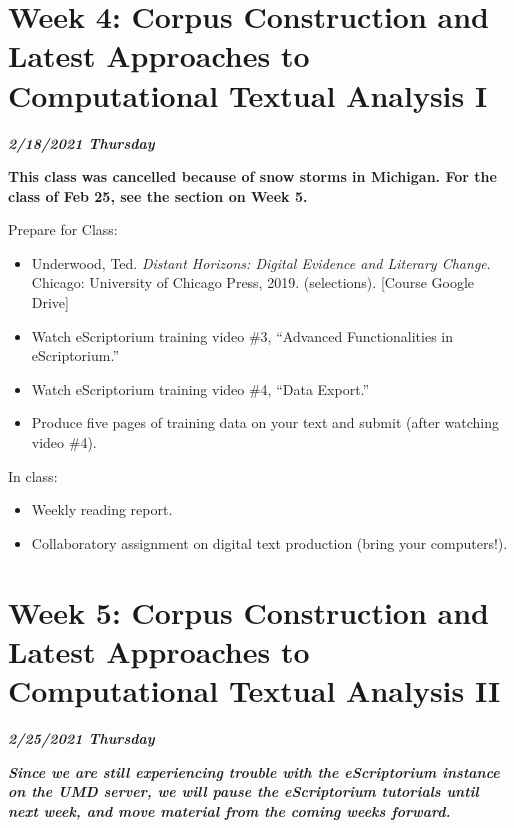 \documentclass[
]{book}
\providecommand{\tightlist}{%
  \setlength{\itemsep}{0pt}\setlength{\parskip}{0pt}}
\begin{document}
\hypertarget{week-4-corpus-construction-and-latest-approaches-to-computational-textual-analysis-i-1}{%
\chapter{Week 4: Corpus Construction and Latest Approaches to Computational Textual Analysis I}\label{week-4-corpus-construction-and-latest-approaches-to-computational-textual-analysis-i-1}}

\textbf{\emph{2/18/2021 Thursday}}

\textbf{This class was cancelled because of snow storms in Michigan. For the class of Feb 25, see the section on Week 5.}

Prepare for Class:

\begin{itemize}
\tightlist
\item
  Underwood, Ted. \emph{Distant Horizons: Digital Evidence and Literary Change}. Chicago: University of Chicago Press, 2019. (selections). {[}Course Google Drive{]}
\item
  Watch eScriptorium training video \#3, ``Advanced Functionalities in eScriptorium.''
\item
  Watch eScriptorium training video \#4, ``Data Export.''
\item
  Produce five pages of training data on your text and submit (after watching video \#4).
\end{itemize}

In class:

\begin{itemize}
\tightlist
\item
  Weekly reading report.
\item
  Collaboratory assignment on digital text production (bring your computers!).
\end{itemize}

\hypertarget{week-5-corpus-construction-and-latest-approaches-to-computational-textual-analysis-ii-1}{%
\chapter{Week 5: Corpus Construction and Latest Approaches to Computational Textual Analysis II}\label{week-5-corpus-construction-and-latest-approaches-to-computational-textual-analysis-ii-1}}

\textbf{\emph{2/25/2021 Thursday}}

\textbf{\emph{Since we are still experiencing trouble with the eScriptorium instance on the UMD server, we will pause the eScriptorium tutorials until next week, and move material from the coming weeks forward.}}
\end{document}

